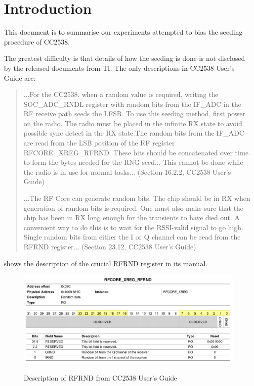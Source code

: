 \section{Introduction}

This document is to summarise our experiments attempted to bias the seeding procedure of CC2538\cite{CC2538_Manual}.

The greatest difficulty is that details of how the seeding is done is not disclosed by the released documents from TI. The only descriptions in CC2538 User's Guide are:
\begin{quote}
...For the CC2538, when a random value is required, writing the SOC\_ADC\_RNDL register with random bits from the IF\_ADC in the RF receive path seeds the LFSR. To use this seeding method, first power on the radio. The radio must be placed in the infinite RX state to avoid possible sync detect in the RX state.The random bits from the IF\_ADC are read from the LSB position of the RF register RFCORE\_XREG\_RFRND. These bits should be concatenated over time to form the bytes needed for the RNG seed... This cannot be done while the radio is in use for normal tasks... (Section 16.2.2, CC2538 User's Guide)

...The RF Core can generate random bits. The chip should be in RX when generation of random bits is required. One must also make sure that the chip has been in RX long enough for the transients to have died out. A convenient way to do this is to wait for the RSSI-valid signal to go high. Single random bits from either the I or Q channel can be read from the RFRND register... (Section 23.12, CC2538 User's Guide)
\end{quote}

 shows the description of the crucial RFRND register in its manual.

\begin{figure}
\center
\caption{Description of RFRND from CC2538 User's Guide}
\includegraphics[width=\linewidth]{./figures/CC2538_RFRND.png}
\label{CC2538_RFRND}
\end{figure}

